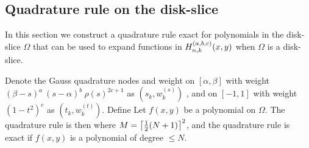 \subsection{Quadrature rule on the disk-slice}

In this section we construct a quadrature rule exact for polynomials in the disk-slice $\Omega$ that can be used to expand functions in $H_{n,k}^{(a,b,c)}(x,y)$ when $\Omega$ is a disk-slice.

\begin{theorem}
Denote the  Gauss quadrature nodes and weight on $[\alpha,\beta]$ with weight $(\beta - s)^a \: (s - \alpha)^b \: \rho(s)^{2c+1}$ as $(s_k,w_k^{(s)})$ , and
 on $[-1,1]$ with weight $(1-t^2)^c$ as $(t_k,w_k^{(t)})$. Define
Let $f(x,y)$ be a polynomial on $\Omega$. The quadrature rule is then
where $M = \left\lceil\frac{1}{2}(N+1)\right\rceil^2$, and the quadrature rule is exact if $f(x,y)$ is a polynomial of degree $\le N$.
\end{theorem}

